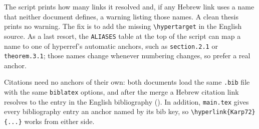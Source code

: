 The script prints how many links it resolved and, if any Hebrew link uses a name that neither document defines, a warning listing those names.
A clean thesis prints no warning.
The fix is to add the missing \verb|\hypertarget| in the English source.
As a last resort, the \texttt{ALIASES} table at the top of the script can map a name to one of hyperref's automatic anchors, such as \texttt{section.2.1} or \texttt{theorem.3.1}; those names change whenever numbering changes, so prefer a real anchor.

Citations need no anchors of their own: both documents load the same \texttt{.bib} file with the same \texttt{biblatex} options, and after the merge a Hebrew citation link resolves to the entry in the English bibliography ().
In addition, \texttt{main.tex} gives every bibliography entry an anchor named by its bib key, so \verb|\hyperlink{Karp72}{...}| works from either side.
